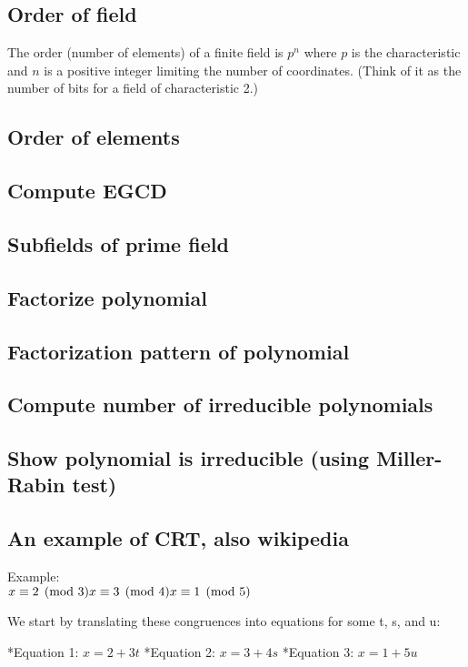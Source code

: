 \documentclass{article}
\begin{document}
\subsection{Order of field}
The order (number of elements) of a finite field is $p^n$ where $p$ is the characteristic and $n$ is a positive integer limiting the number of coordinates. (Think of it as the number of bits for a field of characteristic 2.)

\subsection{Order of elements}

\subsection{Compute EGCD}
\subsection{Subfields of prime field}
\subsection{Factorize polynomial}
\subsection{Factorization pattern of polynomial}
\subsection{Compute number of irreducible polynomials}
\subsection{Show polynomial is irreducible (using Miller-Rabin test)}
\subsection{An example of CRT, also wikipedia}
Example:\\

$ 
  x \equiv 2 \pmod{3} \\
  x \equiv 3 \pmod{4} \\
  x \equiv 1 \pmod{5}
$

We start by translating these congruences into equations for some t, s, and u:

*Equation 1: $x = 2 + 3t$
*Equation 2: $x = 3 + 4s$
*Equation 3: $x = 1 + 5u$
\end{document}

